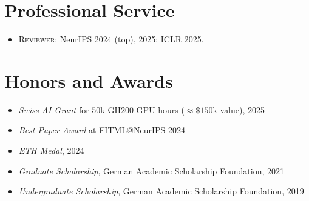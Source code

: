 \documentclass[a4paper,11pt]{article}
\begin{document}
\section*{Professional Service}
\begin{itemize}[leftmargin=1.5em]
  \item \textsc{Reviewer:} NeurIPS 2024 (top), 2025; ICLR 2025.
\end{itemize}

\section*{Honors and Awards}
\begin{itemize}[leftmargin=1.5em]
  \item \emph{Swiss AI Grant} for 50k GH200 GPU hours ($\approx\!\$150\mathrm{k}$ value), 2025
  \item \emph{Best Paper Award} at FITML@NeurIPS 2024
  \item \emph{ETH Medal}, 2024
  \item \emph{Graduate Scholarship}, German Academic Scholarship Foundation, 2021
  \item \emph{Undergraduate Scholarship}, German Academic Scholarship Foundation, 2019
\end{itemize}
\end{document}
